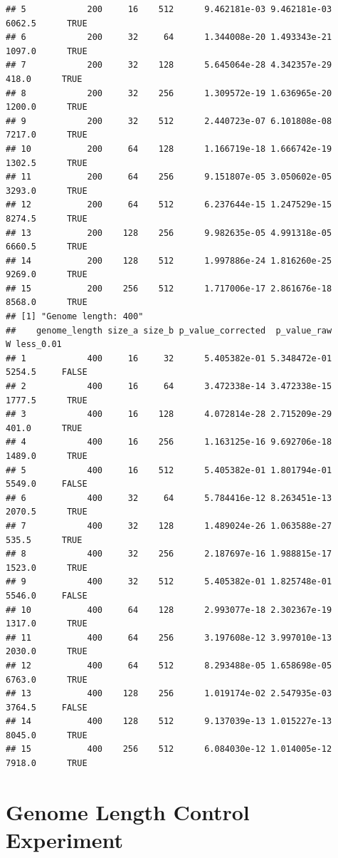 \documentclass[]{book}
\begin{document}
\begin{verbatim}
## 5            200     16    512      9.462181e-03 9.462181e-03 6062.5      TRUE
## 6            200     32     64      1.344008e-20 1.493343e-21 1097.0      TRUE
## 7            200     32    128      5.645064e-28 4.342357e-29  418.0      TRUE
## 8            200     32    256      1.309572e-19 1.636965e-20 1200.0      TRUE
## 9            200     32    512      2.440723e-07 6.101808e-08 7217.0      TRUE
## 10           200     64    128      1.166719e-18 1.666742e-19 1302.5      TRUE
## 11           200     64    256      9.151807e-05 3.050602e-05 3293.0      TRUE
## 12           200     64    512      6.237644e-15 1.247529e-15 8274.5      TRUE
## 13           200    128    256      9.982635e-05 4.991318e-05 6660.5      TRUE
## 14           200    128    512      1.997886e-24 1.816260e-25 9269.0      TRUE
## 15           200    256    512      1.717006e-17 2.861676e-18 8568.0      TRUE
## [1] "Genome length: 400"
##    genome_length size_a size_b p_value_corrected  p_value_raw      W less_0.01
## 1            400     16     32      5.405382e-01 5.348472e-01 5254.5     FALSE
## 2            400     16     64      3.472338e-14 3.472338e-15 1777.5      TRUE
## 3            400     16    128      4.072814e-28 2.715209e-29  401.0      TRUE
## 4            400     16    256      1.163125e-16 9.692706e-18 1489.0      TRUE
## 5            400     16    512      5.405382e-01 1.801794e-01 5549.0     FALSE
## 6            400     32     64      5.784416e-12 8.263451e-13 2070.5      TRUE
## 7            400     32    128      1.489024e-26 1.063588e-27  535.5      TRUE
## 8            400     32    256      2.187697e-16 1.988815e-17 1523.0      TRUE
## 9            400     32    512      5.405382e-01 1.825748e-01 5546.0     FALSE
## 10           400     64    128      2.993077e-18 2.302367e-19 1317.0      TRUE
## 11           400     64    256      3.197608e-12 3.997010e-13 2030.0      TRUE
## 12           400     64    512      8.293488e-05 1.658698e-05 6763.0      TRUE
## 13           400    128    256      1.019174e-02 2.547935e-03 3764.5     FALSE
## 14           400    128    512      9.137039e-13 1.015227e-13 8045.0      TRUE
## 15           400    256    512      6.084030e-12 1.014005e-12 7918.0      TRUE
\end{verbatim}

\hypertarget{genome-length-control-experiment}{%
\chapter{Genome Length Control Experiment}\label{genome-length-control-experiment}}
\end{document}

